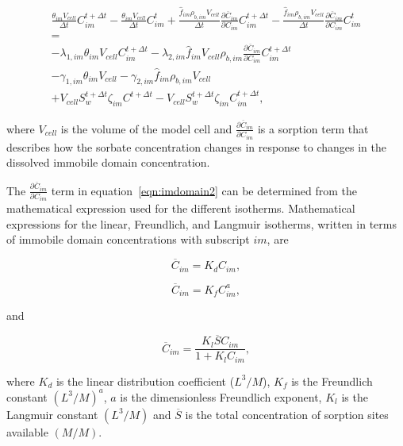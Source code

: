 \begin{equation}
\label{eqn:imdomain2}
\begin{split}
\frac{\theta_{im} V_{cell}}{\Delta t} C_{im}^{t + \Delta t} - 
\frac{\theta_{im} V_{cell}}{\Delta t} C_{im}^t 
+ \frac{\hat{f}_{im} \rho_{b,im} V_{cell}}{\Delta t} \frac{\partial \overline{C}_{im}}{\partial C_{im}} C_{im}^{t + \Delta t}
-  \frac{\hat{f}_{im} \rho_{b,im} V_{cell}}{\Delta t} \frac{\partial \overline{C}_{im}}{\partial C_{im}} C_{im}^{t} \\
= \\
- \lambda_{1,im} \theta_{im} V_{cell} C_{im}^{t + \Delta t}
- \lambda_{2,im} \hat{f}_{im} V_{cell} \rho_{b,im} \frac{\partial \overline{C}_{im}}{\partial C_{im}} C_{im}^{t + \Delta t} \\
- \gamma_{1,im} \theta_{im} V_{cell}  
- \gamma_{2,im} \hat{f}_{im} \rho_{b,im} V_{cell} \\
+ V_{cell} S_w^{t + \Delta t}  \zeta_{im} C^{t + \Delta t}
- V_{cell} S_w^{t + \Delta t}  \zeta_{im} C_{im}^{t + \Delta t} ,
\end{split}
\end{equation}

\noindent where $V_{cell}$ is the volume of the model cell and $\frac{\partial \overline{C}_{im}}{\partial C_{im}}$ is a sorption term that describes how the sorbate concentration changes in response to changes in the dissolved immobile domain concentration.

The $\frac{\partial \overline{C}_{im}}{\partial C_{im}}$ term in equation~\ref{eqn:imdomain2} can be determined from the mathematical expression used for the different isotherms.   Mathematical expressions for the linear, Freundlich, and Langmuir isotherms, written in terms of immobile domain concentrations with subscript $im$, are

\begin{equation}
\label{eqn:linear}
\overline{C}_{im} = K_d C_{im},
\end{equation}

\begin{equation}
\label{eqn:freundlich}
\overline{C}_{im} = K_f C_{im}^a,
\end{equation}

\noindent and

\begin{equation}
\label{eqn:langmuir}
\overline{C}_{im} = \frac{K_l \overline{S} C_{im}}{1 + K_l C_{im}},
\end{equation}

\noindent where $K_d$ is the linear distribution coefficient ($L^3/M$), $K_f$ is the Freundlich constant $(L^3 / M)^a$, $a$ is the dimensionless Freundlich exponent, $K_l$ is the Langmuir constant $(L^3 / M)$ and $\overline{S}$ is the total concentration of sorption sites available $(M/M)$.

